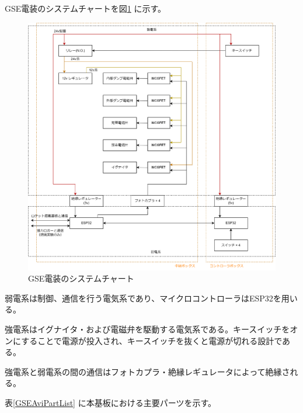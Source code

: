 \documentclass[dvipdfmx,a4j]{jsarticle}
\begin{document}
GSE電装のシステムチャートを図\ref{GSEAviChart} に示す。

\begin{figure}[htbp]
    \centering
    \includegraphics[width = 15cm]{figures/GSEAviChart.drawio.png}
    \caption{GSE電装のシステムチャート}
    \label{GSEAviChart}
\end{figure}

弱電系は制御、通信を行う電気系であり、マイクロコントローラはESP32を用いる。

強電系はイグナイタ・および電磁弁を駆動する電気系である。キースイッチをオンにすることで電源が投入され、キースイッチを抜くと電源が切れる設計である。

強電系と弱電系の間の通信はフォトカプラ・絶縁レギュレータによって絶縁される。

表\ref{GSEAviPartList} に本基板における主要パーツを示す。
\end{document}
